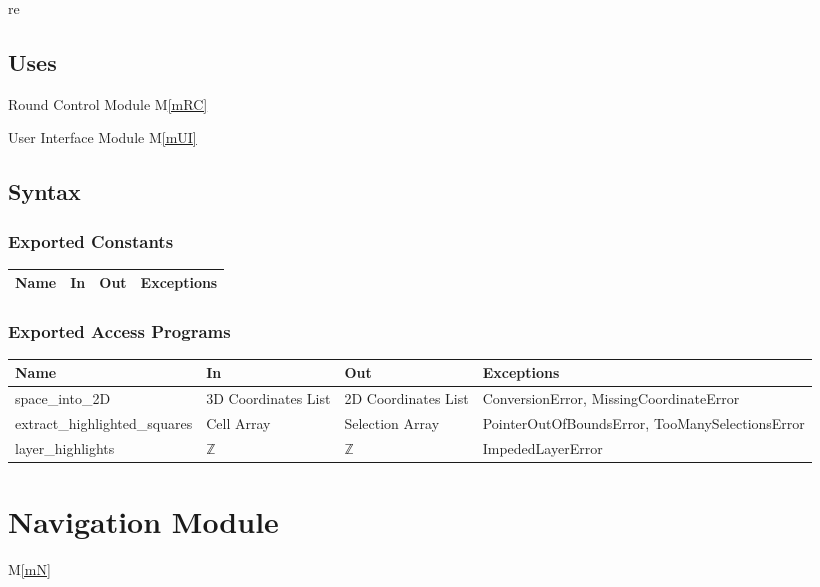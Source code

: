 \documentclass[12pt, titlepage]{article}
\newcommand{\mref}[1]{M\ref{#1}}
\begin{document}
re

\subsection{Uses}

Round Control Module \mref{mRC}

User Interface Module \mref{mUI}



\subsection{Syntax}

\subsubsection{Exported Constants}

\begin{center}
\begin{tabular}{p{4cm} p{4cm} p{4cm} p{4cm}}
\hline
\textbf{Name} & \textbf{In} & \textbf{Out} & \textbf{Exceptions} \\
\hline


\hline
\end{tabular}
\end{center}

\subsubsection{Exported Access Programs}

\begin{center}
\begin{tabular}{p{4cm} p{4cm} p{4cm} p{4cm}}
\hline
\textbf{Name} & \textbf{In} & \textbf{Out} & \textbf{Exceptions} \\
\hline
space\_into\_2D & 3D Coordinates List & 2D Coordinates List & ConversionError, MissingCoordinateError \\
extract\_highlighted\_squares & Cell Array & Selection Array &  PointerOutOfBoundsError, TooManySelectionsError \\
layer\_highlights & $\mathbb{Z}$ & $\mathbb{Z}$ & ImpededLayerError \\


\hline
\end{tabular}
\end{center}

\newpage

\section{Navigation Module} \mref{mN} 
\end{document}
